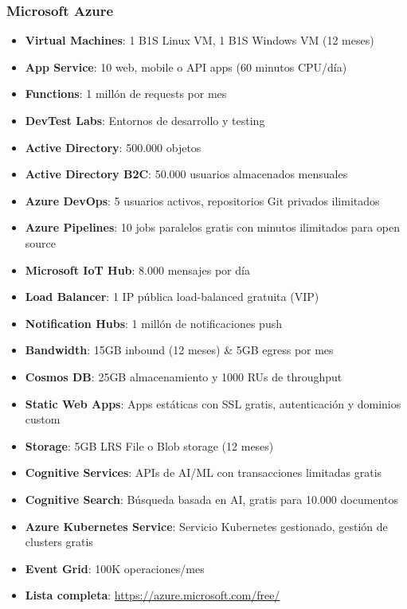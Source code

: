 \subsubsection*{Microsoft Azure}
\begin{itemize}
	\item \textbf{Virtual Machines}: 1 B1S Linux VM, 1 B1S Windows VM (12 meses)
	\item \textbf{App Service}: 10 web, mobile o API apps (60 minutos CPU/día)
	\item \textbf{Functions}: 1 millón de requests por mes
	\item \textbf{DevTest Labs}: Entornos de desarrollo y testing
	\item \textbf{Active Directory}: 500.000 objetos
	\item \textbf{Active Directory B2C}: 50.000 usuarios almacenados mensuales
	\item \textbf{Azure DevOps}: 5 usuarios activos, repositorios Git privados ilimitados
	\item \textbf{Azure Pipelines}: 10 jobs paralelos gratis con minutos ilimitados para open source
	\item \textbf{Microsoft IoT Hub}: 8.000 mensajes por día
	\item \textbf{Load Balancer}: 1 IP pública load-balanced gratuita (VIP)
	\item \textbf{Notification Hubs}: 1 millón de notificaciones push
	\item \textbf{Bandwidth}: 15GB inbound (12 meses) \& 5GB egress por mes
	\item \textbf{Cosmos DB}: 25GB almacenamiento y 1000 RUs de throughput
	\item \textbf{Static Web Apps}: Apps estáticas con SSL gratis, autenticación y dominios custom
	\item \textbf{Storage}: 5GB LRS File o Blob storage (12 meses)
	\item \textbf{Cognitive Services}: APIs de AI/ML con transacciones limitadas gratis
	\item \textbf{Cognitive Search}: Búsqueda basada en AI, gratis para 10.000 documentos
	\item \textbf{Azure Kubernetes Service}: Servicio Kubernetes gestionado, gestión de clusters gratis
	\item \textbf{Event Grid}: 100K operaciones/mes
	\item \textbf{Lista completa}: \url{https://azure.microsoft.com/free/}
\end{itemize}


